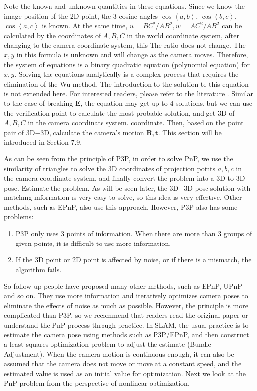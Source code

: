 Note the known and unknown quantities in these equations. Since we know the image position of the 2D point, the 3 cosine angles $\cos \left \langle a,b \right \rangle$, $\cos \left\langle b,c \right \rangle$, $\cos \left \langle a,c \right \rangle$ is known. At the same time, $u=BC^2/AB^2, w=AC^2/AB^2$ can be calculated by the coordinates of $A, B, C$ in the world coordinate system, after changing to the camera coordinate system, this The ratio does not change. The $x,y$ in this formula is unknown and will change as the camera moves. Therefore, the system of equations is a binary quadratic equation (polynomial equation) for $x,y$. Solving the equations analytically is a complex process that requires the elimination of the Wu method. The introduction to the solution to this equation is not extended here. For interested readers, please refer to the literature \cite{GaoHouTangEtAl2003}. Similar to the case of breaking $\bm{E}$, the equation may get up to 4 solutions, but we can use the verification point to calculate the most probable solution, and get 3D of $A, B, C$ in the camera coordinate system. coordinate. Then, based on the point pair of 3D−3D, calculate the camera's motion $\bm{R}, \bm{t}$. This section will be introduced in Section 7.9.

As can be seen from the principle of P3P, in order to solve PnP, we use the similarity of triangles to solve the 3D coordinates of projection points $a, b, c$ in the camera coordinate system, and finally convert the problem into a 3D to 3D pose. Estimate the problem. As will be seen later, the 3D−3D pose solution with matching information is very easy to solve, so this idea is very effective. Other methods, such as EPnP, also use this approach. However, P3P also has some problems:

\begin{enumerate}
\item P3P only uses 3 points of information. When there are more than 3 groups of given points, it is difficult to use more information.
\item If the 3D point or 2D point is affected by noise, or if there is a mismatch, the algorithm fails.
\end{enumerate}

So follow-up people have proposed many other methods, such as EPnP, UPnP and so on. They use more information and iteratively optimizes camera poses to eliminate the effects of noise as much as possible. However, the principle is more complicated than P3P, so we recommend that readers read the original paper or understand the PnP process through practice. In SLAM, the usual practice is to estimate the camera pose using methods such as P3P/EPnP, and then construct a least squares optimization problem to adjust the estimate (Bundle Adjustment). When the camera motion is continuous enough, it can also be assumed that the camera does not move or move at a constant speed, and the estimated value is used as an initial value for optimization. Next we look at the PnP problem from the perspective of nonlinear optimization.

